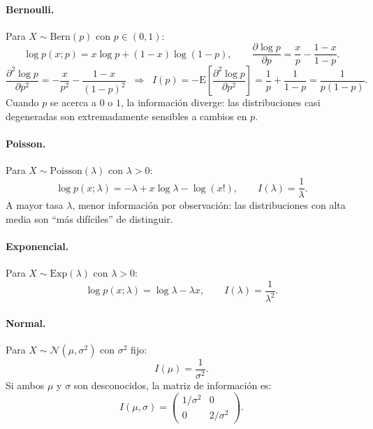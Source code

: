 \paragraph{Bernoulli.} Para $X \sim \mathrm{Bern}(p)$ con $p \in (0,1)$:
\[
\log p(x;p) = x \log p + (1-x)\log(1-p), \qquad
\frac{\partial \log p}{\partial p} = \frac{x}{p} - \frac{1-x}{1-p}.
\]
\[
\frac{\partial^2 \log p}{\partial p^2} = -\frac{x}{p^2} - \frac{1-x}{(1-p)^2} \;\;\Longrightarrow\;\;
I(p) = -\mathrm{E}\!\left[\frac{\partial^2 \log p}{\partial p^2}\right] = \frac{1}{p} + \frac{1}{1-p} = \frac{1}{p(1-p)}.
\]
Cuando $p$ se acerca a $0$ o $1$, la información diverge: las distribuciones casi degeneradas son extremadamente sensibles a cambios en $p$.

\paragraph{Poisson.} Para $X \sim \mathrm{Poisson}(\lambda)$ con $\lambda > 0$:
\[
\log p(x;\lambda) = -\lambda + x \log \lambda - \log(x!), \qquad
I(\lambda) = \frac{1}{\lambda}.
\]
A mayor tasa $\lambda$, menor información por observación: las distribuciones con alta media son ``más difíciles'' de distinguir.

\paragraph{Exponencial.} Para $X \sim \mathrm{Exp}(\lambda)$ con $\lambda > 0$:
\[
\log p(x;\lambda) = \log \lambda - \lambda x, \qquad
I(\lambda) = \frac{1}{\lambda^2}.
\]

\paragraph{Normal.} Para $X \sim \mathcal{N}(\mu, \sigma^2)$ con $\sigma^2$ fijo:
\[
I(\mu) = \frac{1}{\sigma^2}.
\]
Si ambos $\mu$ y $\sigma$ son desconocidos, la matriz de información es:
\[
I(\mu, \sigma) = \begin{pmatrix} 1/\sigma^2 & 0 \\ 0 & 2/\sigma^2 \end{pmatrix}.
\]

\begin{center}
\end{center}

